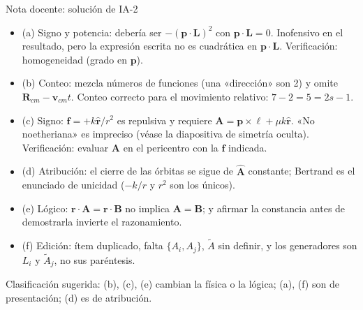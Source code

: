 \documentclass[aspectratio=169]{beamer}
\newcommand{\vr}{\mathbf r}
\newcommand{\vp}{\mathbf p}
\newcommand{\vA}{\mathbf A}
\newcommand{\vl}{\boldsymbol\ell}
\newcommand{\rh}{\hat{\mathbf r}}
\newcommand{\PB}[2]{\{#1,#2\}}
\begin{document}
\begin{frame}{Nota docente: solución de IA-2}
\footnotesize
\begin{itemize}
  \item (a) Signo y potencia: debería ser $-(\vp\cdot\mathbf L)^{2}$ con $\vp\cdot\mathbf L=0$.
        Inofensivo en el resultado, pero la expresión escrita no es cuadrática en $\vp\cdot\mathbf L$.
        Verificación: homogeneidad (grado en $\vp$).
  \item (b) Conteo: mezcla números de funciones (una «dirección» son 2) y omite $\mathbf R_{cm}-\mathbf v_{cm}t$.
        Conteo correcto para el movimiento relativo: $7-2=5=2s-1$.
  \item (c) Signo: $\mathbf f=+k\rh/r^{2}$ es repulsiva y requiere $\vA=\vp\times\vl+\mu k\rh$.
        «No noetheriana» es impreciso (véase la diapositiva de simetría oculta).
        Verificación: evaluar $\vA$ en el pericentro con la $\mathbf f$ indicada.
  \item (d) Atribución: el cierre de las órbitas se sigue de $\hat{\vA}$ constante; Bertrand es
        el enunciado de unicidad ($-k/r$ y $r^{2}$ son los únicos).
  \item (e) Lógico: $\vr\cdot\vA=\vr\cdot\mathbf B$ no implica $\vA=\mathbf B$; y afirmar la
        constancia antes de demostrarla invierte el razonamiento.
  \item (f) Edición: ítem duplicado, falta $\PB{A_i}{A_j}$, $\tilde A$ sin definir, y los
        generadores son $L_i$ y $\tilde A_j$, no sus paréntesis.
\end{itemize}
Clasificación sugerida: (b), (c), (e) cambian la física o la lógica; (a), (f) son de
presentación; (d) es de atribución.
\end{frame}
\end{document}
